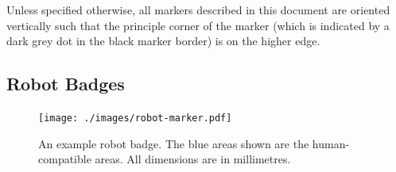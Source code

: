 Unless specified otherwise, all markers described in this document are oriented vertically such that the principle corner of the marker (which is indicated by a dark grey dot in the black marker border) is on the higher edge.

\subsection{Robot Badges}
\label{sec:robot-badges}

\begin{figure}
  \centering
  \texttt{[image: ./images/robot-marker.pdf]}
  \caption{An example robot badge.
           The blue areas shown are the human-compatible areas.
	   All dimensions are in millimetres.}
  \label{fig:example-badge}
\end{figure}

